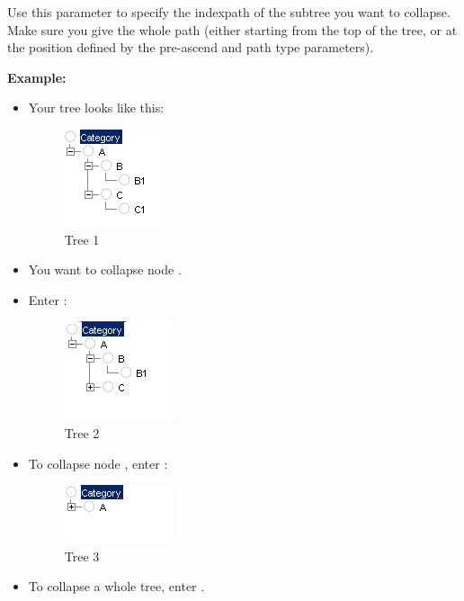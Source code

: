 
Use this parameter to specify the indexpath of the subtree you want to collapse.
Make sure you give the whole path (either starting from the top of the tree, or at the position defined by the pre-ascend and path type parameters).



\textbf{Example:}

\begin{itemize}
\item Your tree looks like this:

\begin{figure}
\begin{center}
\includegraphics{PS/Treeexample}
\caption{Tree 1}
\label{treeexample}
\end{center}
\end{figure}

\item You want to collapse node . 
\item Enter :

\begin{figure}
\begin{center}
\includegraphics{PS/Treeexample2}
\caption{Tree 2}
\label{treeexample2}
\end{center}
\end{figure}

\item To collapse node , enter :

\begin{figure}
\begin{center}
\includegraphics{PS/Treeexample3}
\caption{Tree 3}
\label{treeexample3}
\end{center}
\end{figure}

\item To collapse a whole tree, enter .
\end{itemize}
